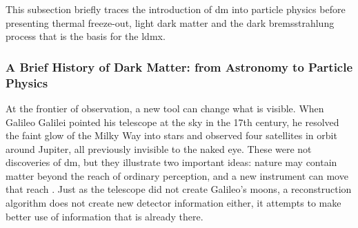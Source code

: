 



This subsection briefly traces the introduction of \gls{dm} into particle
physics before presenting thermal freeze-out, light dark matter and the dark
bremsstrahlung process that is the basis for the \gls{ldmx}.

\subsubsection{A Brief History of Dark Matter: from Astronomy to Particle Physics}
\label{sec:history}


At the frontier of observation, a new tool can change what is visible. When
Galileo Galilei pointed his telescope at the sky in the 17th century, he
resolved the faint glow of the Milky Way into stars and observed four
satellites in orbit around Jupiter, all previously invisible to the naked eye.
These were not discoveries of \gls{dm}, but they illustrate two important ideas:
nature may contain matter beyond the reach of ordinary perception, and a new
instrument can move that reach \cite{bertone2016-history-dark-matter}. Just as
the telescope did not create Galileo's moons, a reconstruction algorithm does
not create new detector information either, it attempts to make better use of
information that is already there.



